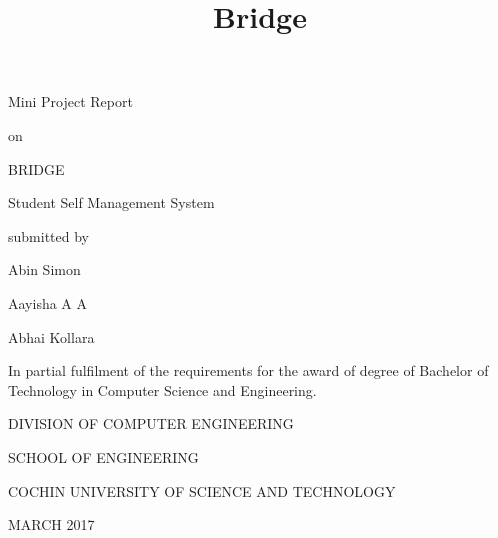 \documentclass{article}
\renewcommand{\maketitle}{
\begin{center}
\LARGE
Mini Project Report

\hspace{1em}

on

\hspace{1em}

\huge
BRIDGE

\hspace{1em}
\Large
Student Self Management System

\hspace{1em}

submitted by

\hspace{1em}

\Large
Abin Simon

\Large
Aayisha A A

\Large
Abhai Kollara
\end{center}
}
\begin{document}
\title{Bridge}

\vspace*{\fill}

\maketitle

\begin{center}
\large
In partial fulfilment of the requirements for the award of degree of Bachelor of Technology in Computer Science and Engineering.

\hspace{1em}

\LARGE
DIVISION OF COMPUTER ENGINEERING 

SCHOOL OF ENGINEERING

COCHIN UNIVERSITY OF SCIENCE AND TECHNOLOGY

\hspace{1em}

\large
MARCH 2017
\end{center}

\vspace*{\fill}

\newpage

\vspace*{\fill}
\end{document}
